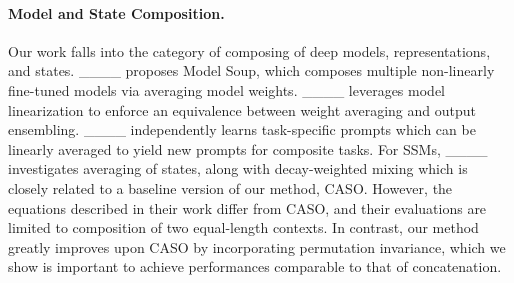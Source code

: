 \paragraph{Model and State Composition.}
Our work falls into the category of 
composing of deep models, representations, and states. ____ proposes Model Soup, which composes multiple non-linearly fine-tuned models via averaging model weights. ____ leverages model linearization to enforce an equivalence between weight averaging and output ensembling. ____ independently learns task-specific prompts which can be linearly averaged to yield new prompts for composite tasks.
For SSMs, ____ investigates averaging of states, along with decay-weighted mixing which is closely related to a baseline version of our method, CASO. However, the equations described in their work differ from CASO, and their evaluations are limited to composition of two equal-length contexts. In contrast, our method greatly improves upon CASO by incorporating permutation invariance, which we show is important to achieve performances comparable to that of concatenation.